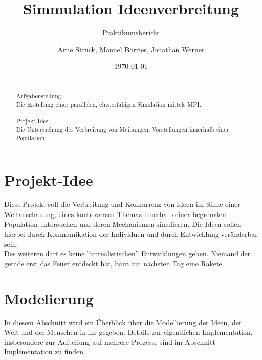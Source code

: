 \title{Simmulation Ideenverbreitung}
\subtitle{Praktikumsbericht}

\author{Arne Struck, Manuel Börries, Jonathan Werner}

  
\date{\today}

\maketitle


\begin{abstract}
\quad \\
Aufgabenstellung: \\
Die Erstellung einer parallelen, clusterfähigen Simulation mittels MPI. \\ \\
Projekt Idee: \\
Die Untersuchung der Verbreitung von Meinungen, Vorstellungen innerhalb einer Population.
\end{abstract}

\tableofcontents
\newpage
\section{Projekt-Idee}
Diese Projekt soll die Verbreitung und Konkurrenz von Ideen im Sinne einer Weltanschauung, eines kontroversen Themas innerhalb einer begrenzten Population untersuchen und deren Mechanismen simulieren. Die Ideen sollen hierbei durch Kommunikation der Individuen und durch Entwicklung veränderbar sein. \\
Des weiteren darf es keine ''unrealistischen'' Entwicklungen geben. Niemand der gerade erst das Feuer entdeckt hat, baut am nächsten Tag eine Rakete.

\section{Modelierung} %
In diesem Abschnitt wird ein Überblick über die Modellierung der Ideen, der Welt und der Menschen in ihr gegeben. Details zur eigentlichen Implementation, insbesondere zur Aufteilung auf mehrere Prozesse sind im Abschnitt Implementation zu finden.
